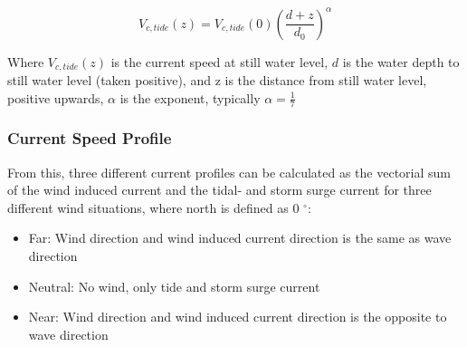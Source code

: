  \begin{equation}
      V_{c,tide}(z)= V_{c,tide}(0) \left( \frac{d+z}{d_0}\right)^{\alpha}
  \end{equation}
  
  \noindent Where $ V_{c,tide}(z)$ is the current speed at still water level, $d$ is the water depth to still water level (taken positive), and z is the distance from still water level, positive upwards, $\alpha$ is the exponent, typically $\alpha = \frac{1}{7}$

   \subsubsection{Current Speed Profile}
  From this, three different current profiles can be calculated as the vectorial sum of the wind induced current and the tidal- and storm surge current for three different wind situations, where north is defined as 0 $^{\circ}$: 
  \begin{itemize}
      \item Far: Wind direction and wind induced current direction is the same as wave direction
     \item Neutral: No wind, only tide and storm surge current
     \item Near:  Wind direction and wind induced current direction is the opposite to wave direction
  \end{itemize}
  
